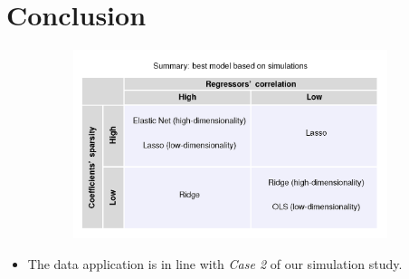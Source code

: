 \section{Conclusion}


\begin{frame}
    \begin{figure}
        \centering
        \includegraphics[width=11cm,height=5.5cm, left]{Img/2x2table.png}
    \end{figure}
    
\begin{itemize}
        \item The data application is in line with \textit{Case 2} of our simulation study.
    \end{itemize}
\end{frame}
